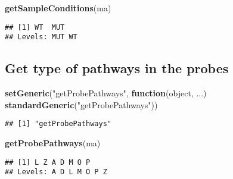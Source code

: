 \documentclass[]{article}
\newenvironment{Shaded}{\begin{snugshade}}{\end{snugshade}}
\newcommand{\ControlFlowTok}[1]{\textcolor[rgb]{0.13,0.29,0.53}{\textbf{#1}}}
\newcommand{\KeywordTok}[1]{\textcolor[rgb]{0.13,0.29,0.53}{\textbf{#1}}}
\newcommand{\NormalTok}[1]{#1}
\newcommand{\OperatorTok}[1]{\textcolor[rgb]{0.81,0.36,0.00}{\textbf{#1}}}
\newcommand{\StringTok}[1]{\textcolor[rgb]{0.31,0.60,0.02}{#1}}
\begin{document}
\begin{Shaded}
\begin{Highlighting}[]
\KeywordTok{getSampleConditions}\NormalTok{(ma)}
\end{Highlighting}
\end{Shaded}

\begin{verbatim}
## [1] WT  MUT
## Levels: MUT WT
\end{verbatim}

\hypertarget{get-type-of-pathways-in-the-probes}{%
\subsection{Get type of pathways in the
probes}\label{get-type-of-pathways-in-the-probes}}

\begin{Shaded}
\begin{Highlighting}[]
\KeywordTok{setGeneric}\NormalTok{(}\StringTok{"getProbePathways"}\NormalTok{, }\ControlFlowTok{function}\NormalTok{(object, ...)}
           \KeywordTok{standardGeneric}\NormalTok{(}\StringTok{"getProbePathways"}\NormalTok{))}
\end{Highlighting}
\end{Shaded}

\begin{verbatim}
## [1] "getProbePathways"
\end{verbatim}

\begin{Shaded}
\end{Shaded}

\begin{Shaded}
\begin{Highlighting}[]
\KeywordTok{getProbePathways}\NormalTok{(ma)}
\end{Highlighting}
\end{Shaded}

\begin{verbatim}
## [1] L Z A D M O P
## Levels: A D L M O P Z
\end{verbatim}
\end{document}
